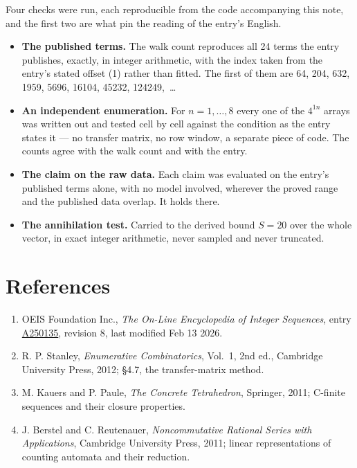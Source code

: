\documentclass[11pt]{article}
\theoremstyle{definition}
\begin{document}
Four checks were run, each reproducible from the code accompanying this note, and the first two are what pin the reading of the entry's English.

\begin{itemize}

\item {\bfseries The published terms.} The walk count reproduces all 24 terms the entry publishes, exactly, in integer arithmetic, with the index taken from the entry's stated offset (1) rather than fitted. The first of them are 64, 204, 632, 1959, 5696, 16104, 45232, 124249,~\dots

\item {\bfseries An independent enumeration.} For $n = 1,\dots,8$ every one of the $4^{1n}$ arrays was written out and tested cell by cell against the condition as the entry states it --- no transfer matrix, no row window, a separate piece of code. The counts agree with the walk count and with the entry.

\item {\bfseries The claim on the raw data.} Each claim was evaluated on the entry's published terms alone, with no model involved, wherever the proved range and the published data overlap. It holds there.

\item {\bfseries The annihilation test.} Carried to the derived bound $S = 20$ over the whole vector, in exact integer arithmetic, never sampled and never truncated.

\end{itemize}

\section{References}

\begin{enumerate}

\item OEIS Foundation Inc., \emph{The On-Line Encyclopedia of Integer Sequences}, entry \href{https://oeis.org/A250135}{A250135}, revision 8, last modified Feb 13 2026.

\item R. P. Stanley, \emph{Enumerative Combinatorics}, Vol.~1, 2nd ed., Cambridge University Press, 2012; \S4.7, the transfer-matrix method.

\item M. Kauers and P. Paule, \emph{The Concrete Tetrahedron}, Springer, 2011; C-finite sequences and their closure properties.

\item J. Berstel and C. Reutenauer, \emph{Noncommutative Rational Series with Applications}, Cambridge University Press, 2011; linear representations of counting automata and their reduction.

\end{enumerate}
\end{document}

